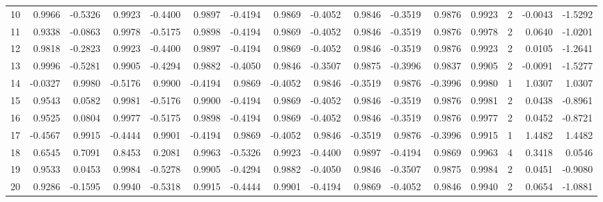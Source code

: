 \begin{tabular}{lrrrrrrrrrrrrrrr}
10  &      0.9966 & -0.5326 &  0.9923 & -0.4400 &  0.9897 & -0.4194 &  0.9869 & -0.4052 &  0.9846 & -0.3519 &   0.9876 &     0.9923 &      2 &                   -0.0043 &                    -1.5292 \\
11  &      0.9338 & -0.0863 &  0.9978 & -0.5175 &  0.9898 & -0.4194 &  0.9869 & -0.4052 &  0.9846 & -0.3519 &   0.9876 &     0.9978 &      2 &                    0.0640 &                    -1.0201 \\
12  &      0.9818 & -0.2823 &  0.9923 & -0.4400 &  0.9897 & -0.4194 &  0.9869 & -0.4052 &  0.9846 & -0.3519 &   0.9876 &     0.9923 &      2 &                    0.0105 &                    -1.2641 \\
13  &      0.9996 & -0.5281 &  0.9905 & -0.4294 &  0.9882 & -0.4050 &  0.9846 & -0.3507 &  0.9875 & -0.3996 &   0.9837 &     0.9905 &      2 &                   -0.0091 &                    -1.5277 \\
14  &     -0.0327 &  0.9980 & -0.5176 &  0.9900 & -0.4194 &  0.9869 & -0.4052 &  0.9846 & -0.3519 &  0.9876 &  -0.3996 &     0.9980 &      1 &                    1.0307 &                     1.0307 \\
15  &      0.9543 &  0.0582 &  0.9981 & -0.5176 &  0.9900 & -0.4194 &  0.9869 & -0.4052 &  0.9846 & -0.3519 &   0.9876 &     0.9981 &      2 &                    0.0438 &                    -0.8961 \\
16  &      0.9525 &  0.0804 &  0.9977 & -0.5175 &  0.9898 & -0.4194 &  0.9869 & -0.4052 &  0.9846 & -0.3519 &   0.9876 &     0.9977 &      2 &                    0.0452 &                    -0.8721 \\
17  &     -0.4567 &  0.9915 & -0.4444 &  0.9901 & -0.4194 &  0.9869 & -0.4052 &  0.9846 & -0.3519 &  0.9876 &  -0.3996 &     0.9915 &      1 &                    1.4482 &                     1.4482 \\
18  &      0.6545 &  0.7091 &  0.8453 &  0.2081 &  0.9963 & -0.5326 &  0.9923 & -0.4400 &  0.9897 & -0.4194 &   0.9869 &     0.9963 &      4 &                    0.3418 &                     0.0546 \\
19  &      0.9533 &  0.0453 &  0.9984 & -0.5278 &  0.9905 & -0.4294 &  0.9882 & -0.4050 &  0.9846 & -0.3507 &   0.9875 &     0.9984 &      2 &                    0.0451 &                    -0.9080 \\
20  &      0.9286 & -0.1595 &  0.9940 & -0.5318 &  0.9915 & -0.4444 &  0.9901 & -0.4194 &  0.9869 & -0.4052 &   0.9846 &     0.9940 &      2 &                    0.0654 &                    -1.0881 \\

\end{tabular}
